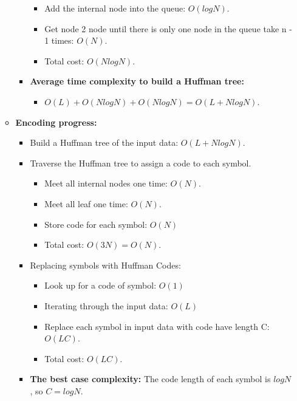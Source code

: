 \begin{enumerate}[label=\textbf{\Alph*.}]
\begin{itemize}
\begin{itemize}
\begin{itemize}
                    \item Add the internal node into the queue: $O(logN)$.
                    \item Get node 2 node until there is only one node in the queue take n - 1 times: $O(N)$.
                    \item Total cost: $O(NlogN)$.
                \end{itemize}
                \item \textbf{Average time complexity to build a Huffman tree:}
                \begin{itemize} 
                    \item $O(L) + O(NlogN) + O(NlogN) = O(L + NlogN)$.
                \end{itemize}
            \end{itemize}
            \item \textbf{Encoding progress:}   
            \begin{itemize}
                \item Build a Huffman tree of the input data: $O(L + NlogN)$.
                \item Traverse the Huffman tree to assign a code to each symbol.
                \begin{itemize}
                    \item Meet all internal nodes one time: $O(N)$.
                    \item Meet all leaf one time: $O(N)$.
                    \item Store code for each symbol: $O(N)$
                    \item Total cost: $O(3N) = O(N)$.
                \end{itemize}
                \item Replacing symbols with Huffman Codes:
                \begin{itemize}
                    \item Look up for a code of symbol: $O(1)$
                    \item Iterating through the input data: $O(L)$
                    \item Replace each symbol in input data with code have length C: $O(LC)$.
                    \item Total cost: $O(LC)$.
                \end{itemize}
                \item \textbf{The best case complexity:} The code length of each symbol is $logN$, so $C = logN$.

\end{itemize}
\end{itemize}
\end{enumerate}
